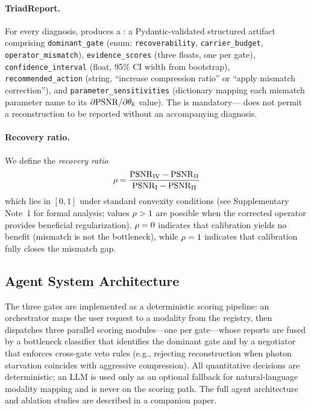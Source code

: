 \paragraph{TriadReport.}
For every diagnosis, \pwm{} produces a \triadreport{}: a Pydantic-validated
structured artifact comprising
\texttt{dominant\_gate} (enum: \texttt{recoverability},
\texttt{carrier\_budget}, \texttt{operator\_mismatch}),
\texttt{evidence\_scores} (three floats, one per gate),
\texttt{confidence\_interval} (float, 95\% CI width from bootstrap),
\texttt{recommended\_action} (string, \eg{} ``increase compression ratio''
or ``apply mismatch correction''), and
\texttt{parameter\_sensitivities} (dictionary mapping each mismatch
parameter name to its $\partial \mathrm{PSNR} / \partial \theta_k$ value).
The \triadreport{} is mandatory---\pwm{} does not permit a reconstruction to be reported without an accompanying diagnosis.

\paragraph{Recovery ratio.}
We define the \emph{recovery ratio}
\begin{equation}
  \rho = \frac{\mathrm{PSNR}_{\text{IV}} - \mathrm{PSNR}_{\text{II}}}
                        {\mathrm{PSNR}_{\text{I}} - \mathrm{PSNR}_{\text{II}}}
  \label{eq:recovery_ratio}
\end{equation}
which lies in $[0, 1]$ under standard convexity conditions (see Supplementary Note~1 for formal analysis; values $\rho > 1$ are possible when the corrected operator provides beneficial regularization).
$\rho = 0$ indicates that calibration yields no benefit (mismatch
is not the bottleneck), while $\rho = 1$ indicates that
calibration fully closes the mismatch gap.


\subsection*{Agent System Architecture}
\label{sec:methods:agents}

The three gates are implemented as a deterministic scoring pipeline:
an orchestrator maps the user request to a modality from the registry,
then dispatches three parallel scoring modules---one per gate---whose
reports are fused by a bottleneck classifier that identifies the dominant
gate and by a negotiator that enforces cross-gate veto rules
(e.g., rejecting reconstruction when photon starvation coincides with
aggressive compression).  All quantitative decisions are deterministic;
an LLM is used only as an optional fallback for natural-language modality
mapping and is never on the scoring path.  The full agent architecture
and ablation studies are described in a companion paper.

